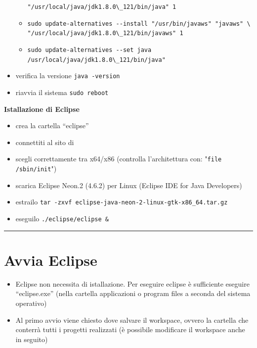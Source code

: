 \documentclass{article}
\begin{document}
\begin{itemize}
\begin{itemize}
	  \verb!"/usr/local/java/jdk1.8.0\_121/bin/java" 1!
\item \verb!sudo update-alternatives --install "/usr/bin/javaws" "javaws" \! \\  				      
	  \verb!"/usr/local/java/jdk1.8.0\_121/bin/javaws" 1!
\item \verb!sudo update-alternatives --set java /usr/local/java/jdk1.8.0\_121/bin/java"!
\end{itemize} 
\item verifica la versione \texttt{java -version}
\item riavvia il sistema \texttt{sudo reboot}
\end{itemize}

\textbf{Istallazione di Eclipse}
\begin{itemize}
\item crea la cartella ``eclipse''
\item connettiti al sito di \href{https://eclipse.org/downloads/}{}
\item scegli correttamente tra x64/x86 (controlla l'architettura con:
  "\texttt{file /sbin/init}")
\item scarica Eclipse Neon.2 (4.6.2) per Linux (Eclipse IDE for Java Developers)
\item estrailo  \texttt{tar -zxvf eclipse-java-neon-2-linux-gtk-x86\_64.tar.gz}
\item eseguilo \texttt{./eclipse/eclipse \&}
\end{itemize}


\hrule
\section{Avvia Eclipse}
\begin{itemize}
\item Eclipse non necessita di istallazione. Per eseguire eclipse \` e sufficiente eseguire ``eclipse.exe'' (nella cartella applicazioni o program files a seconda del sistema operativo)
\item Al primo avvio viene chiesto dove salvare il workspace, ovvero la cartella  che conterr\` a tutti i progetti realizzati (\`e possibile modificare il workspace anche in seguito)
\end{itemize}
\end{document}

